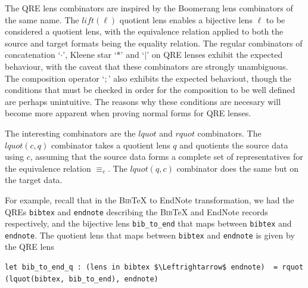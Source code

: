 \documentclass[acmsmall,review,anonymous]{acmart}
\newcommand{\kw}[1]{\ensuremath{\mathit{#1}}}
\newcommand{\bibtex}{\textsc{Bib}\TeX{}}
\newcommand{\eqrel}[1]{\ensuremath{\equiv_{#1}}}
\newcommand{\cd}[1]{\lstinline[backgroundcolor=\color{white}]$#1$}
\begin{document}
The QRE lens combinators are inspired by the Boomerang lens combinators of the
same name. The $\kw{lift}(\ell)$ quotient lens enables a bijective lens
$\ell$ to be considered a quotient lens, with the equivalence relation applied
to both the source and target formats being the equality relation. The
regular combinators of concatenation `$\cdot$', Kleene star `$*$' and
`$|$' on QRE lenses exhibit the expected behaviour, with the caveat that these
combinators are strongly unambiguous. The composition operator `$;$' also
exhibits the expected behaviout, though the conditions that must be checked in
order for the composition to be well defined are perhaps unintuitive. The
reasons why these conditions are necesary will become more apparent when
proving normal forms for QRE lenses.

The interesting combinators are the $\kw{lquot}$ and $\kw{rquot}$
combinators. The $\kw{lquot}(c, q)$ combinator takes a quotient lens $q$ and
quotients the source data using $c$, assuming that the source data forms a
complete set of representatives for the equivalence relation $\eqrel{c}$. The
$\kw{lquot}(q, c)$ combinator does the same but on the target data.

For example, recall that in the \bibtex{} to EndNote transformation, we had the
QREs \cd{bibtex} and \cd{endnote} describing the \bibtex{} and EndNote records
respectively, and the bijective lens \cd{bib_to_end} that maps between
\cd{bibtex} and \cd{endnote}. The quotient lens that maps between
\cd{bibtex} and \cd{endnote} is given by the QRE lens

\begin{lstlisting}
let bib_to_end_q : (lens in bibtex $\Leftrightarrow$ endnote)  = rquot (lquot(bibtex, bib_to_end), endnote)
\end{lstlisting}

\end{document}
